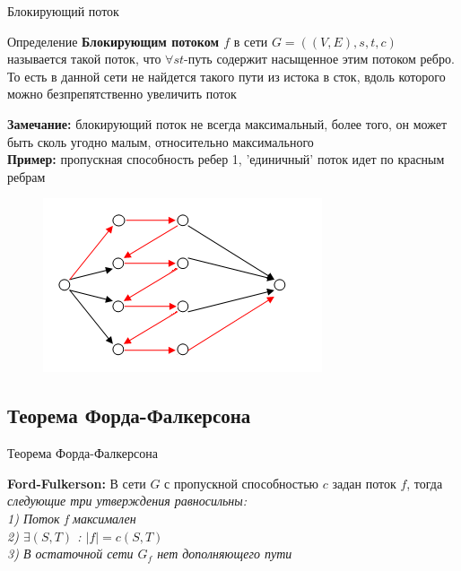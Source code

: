 \documentclass{beamer}
\begin{document}
\begin{frame}{Блокирующий поток}
    \small {
    \begin{exampleblock}{Определение}
        \textbf{Блокирующим потоком $f$} в сети $G = ((V, E), s, t, c)$ называется такой поток, что $\forall st$-путь содержит насыщенное этим потоком ребро. То есть в данной сети не найдется такого пути из истока в сток, вдоль которого можно безпрепятственно увеличить поток 
    \end{exampleblock}
    \textbf{Замечание: } блокирующий поток не всегда максимальный, более того, он может быть сколь угодно малым, относительно максимального \\
    \pause
    \textbf{Пример:} пропускная способность ребер 1, 
        'единичный' поток идет по красным ребрам
    }
    \begin{figure}[h!]
        \advance\leftskip-3cm
        \advance\rightskip-3cm

        \includegraphics[scale=0.7]{blocking_flow.png}
        \label{fig: blocking_flow}
    \end{figure}
\end{frame}

\subsection{Теорема Форда-Фалкерсона}
\begin{frame}{Теорема Форда-Фалкерсона}
    \begin{theorem}
        \textbf{Ford-Fulkerson:} В сети $G$ с пропускной способностью $c$ задан поток $f$, тогда \textit{следующие три утверждения равносильны:\\
        1) Поток f максимален\\
        2) $\exists (S, T)$ : $|f| = c(S, T)$\\
        3) В остаточной сети $G_f$ нет дополняющего пути
        }
    \end{theorem}
\end{frame}
\end{document}
